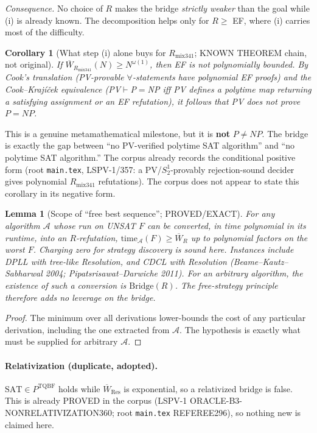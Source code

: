 \documentclass[11pt]{article}
\newtheorem{corollary}[theorem]{Corollary}
\newtheorem{lemma}[theorem]{Lemma}
\begin{document}
\noindent\emph{Consequence.} No choice of $R$ makes the bridge \emph{strictly weaker} than the goal while (i) is already known.
The decomposition helps only for $R\ge$ EF, where (i) carries most of the difficulty.

\begin{corollary}[What step (i) alone buys for $R_{\mathrm{mix341}}$; KNOWN THEOREM chain, not original]
If $\overline W_{R_{\mathrm{mix341}}}(N)\ge N^{\omega(1)}$, then EF is not polynomially bounded.
By Cook's translation (PV-provable $\forall$-statements have polynomial EF proofs) and the Cook--Krajíček equivalence (PV$\vdash$P$=$NP iff PV defines a polytime map returning a satisfying assignment or an EF refutation), it follows that \emph{PV does not prove $P=NP$}.
\end{corollary}
\noindent This is a genuine metamathematical milestone, but it is \textbf{not} $P\ne NP$.
The bridge is exactly the gap between ``no PV-verified polytime SAT algorithm'' and ``no polytime SAT algorithm.''
The corpus already records the conditional positive form (root \texttt{main.tex}, LSPV-1/357: a PV/$S^1_2$-provably rejection-sound decider gives polynomial $R_{\mathrm{mix341}}$ refutations).
The corpus does not appear to state this corollary in its negative form.

\begin{lemma}[Scope of ``free best sequence''; PROVED/EXACT]
For any algorithm $\mathcal A$ whose run on UNSAT $F$ can be converted, in time polynomial in its runtime, into an $R$-refutation, $\mathrm{time}_{\mathcal A}(F)\ge \overline W_R$ up to polynomial factors on the worst $F$.
Charging zero for strategy discovery is sound here.
Instances include DPLL with tree-like Resolution, and CDCL with Resolution (Beame--Kautz--Sabharwal 2004; Pipatsrisawat--Darwiche 2011).
For an arbitrary algorithm, the existence of such a conversion \emph{is} $\mathrm{Bridge}(R)$.
The free-strategy principle therefore adds no leverage on the bridge.
\end{lemma}
\begin{proof}
The minimum over all derivations lower-bounds the cost of any particular derivation, including the one extracted from $\mathcal A$.
The hypothesis is exactly what must be supplied for arbitrary $\mathcal A$.
\end{proof}

\paragraph{Relativization (duplicate, adopted).}
$\mathrm{SAT}\in P^{\mathrm{TQBF}}$ holds while $\overline W_{\mathrm{Res}}$ is exponential, so a relativized bridge is false.
This is already PROVED in the corpus (LSPV-1 ORACLE-B3-NONRELATIVIZATION360; root \texttt{main.tex} REFEREE296), so nothing new is claimed here.
\end{document}
